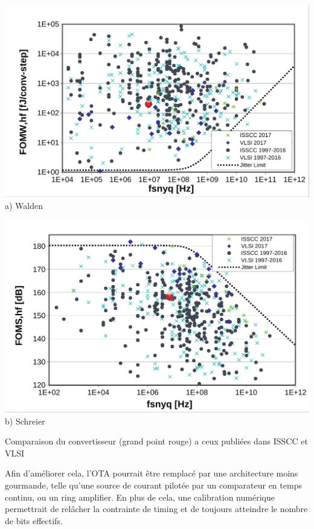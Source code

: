 \begin{mdframed}[linecolor=Prune,linewidth=1]
\begin{center}
    \centering
    \begin{minipage}[b]{0.49\linewidth}
        \centering
        \includegraphics[width=\textwidth]{Abstract/Figs/WaldenFoM-a.pdf}
        a) Walden
    \end{minipage}
    \begin{minipage}[b]{0.49\linewidth}
        \centering
        \includegraphics[width=\textwidth]{Abstract/Figs/SchreierFoM-a.pdf}
        b) Schreier
    \end{minipage}
    \caption[]{Comparaison du convertisseur (grand point rouge) a ceux publiées dans ISSCC et VLSI}
	\label{fig:fom-fr}
\end{center}

Afin d'améliorer cela, l'OTA pourrait être remplacé par une architecture moins gourmande, telle qu'une source de courant pilotée par un comparateur en temps continu, ou un ring amplifier. En plus de cela, une calibration numérique permettrait de relâcher la contrainte de timing et de toujours atteindre le nombre de bits effectifs.


\end{mdframed}
